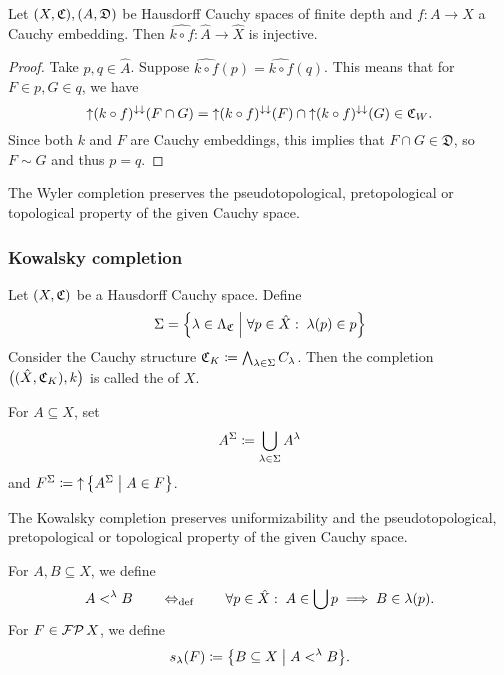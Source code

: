 \begin{lemma}
Let $\sSet{X, \mathfrak{C}}, \sSet{A, \mathfrak{D}}$ be Hausdorff Cauchy spaces of finite depth and $f: A\to X$ a Cauchy embedding. Then $\widehat{k\circ f}: \hat{A}\to \hat{X}$ is injective.
\end{lemma}
\begin{proof}
Take $p,q\in \hat{A}$. Suppose $\widehat{k\circ f}(p) = \widehat{k\circ f}(q)$. This means that for $F\in p, G\in q$, we have
\[ \operatorname{\uparrow} (k\circ f)^{\downarrow\downarrow}(F\cap G) = \operatorname{\uparrow} (k\circ f)^{\downarrow\downarrow}(F)\cap \operatorname{\uparrow} (k\circ f)^{\downarrow\downarrow}(G) \in \mathfrak{C}_W. \]
Since both $k$ and $F$ are Cauchy embeddings, this implies that $F\cap G\in \mathfrak{D}$, so $F\sim G$ and thus $p=q$.
\end{proof}

\begin{proposition}
The Wyler completion preserves the pseudotopological, pretopological or topological property of the given Cauchy space.
\end{proposition}

\subsubsection{Kowalsky completion}
\begin{definition}
Let $\sSet{X, \mathfrak{C}}$ be a Hausdorff Cauchy space. Define
\[ \Sigma = \setbuilder{\lambda \in \Lambda_\mathfrak{C}}{\forall p\in \hat{X}: \; \lambda(p) \in p} \]
Consider the Cauchy structure $\mathfrak{C}_K \coloneqq\bigwedge_{\lambda \in \Sigma}C_\lambda$. Then the completion $\sSet[\big]{\sSet[]{\hat{X}, \mathfrak{C}_K}, k}$ is called the  of $X$.
\end{definition}

For $A\subseteq X$, set
\[ A^\Sigma \coloneqq \bigcup_{\lambda\in \Sigma}A^\lambda \]
and $F^\Sigma \defeq \upset\setbuilder{A^\Sigma}{A\in F}$.

\begin{proposition}
The Kowalsky completion preserves uniformizability and the pseudotopological, pretopological or topological property of the given Cauchy space.
\end{proposition}

For $A,B\subseteq X$, we define
\[ A <^\lambda B \quad \quad\Leftrightarrow_{\text{def}}\quad \quad \forall p\in \hat{X}: \; A\in\bigcup p \implies B\in\lambda(p). \]
For $F\in\operatorname{\mathcal{FP}}{X}$, we define
\[ s_\lambda(F) \defeq \setbuilder{B\subseteq X}{A <^\lambda B}. \]


